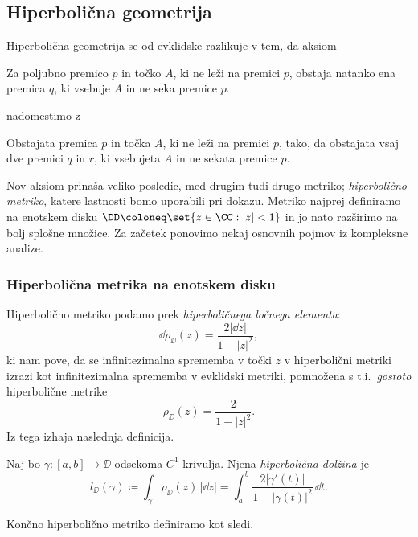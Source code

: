 \subsection{Hiperbolična geometrija}

Hiperbolična geometrija se od evklidske razlikuje v tem, da aksiom

\begin{aksiom}
    Za poljubno premico \(p\) in točko \(A\), ki ne leži na premici \(p\), obstaja natanko ena premica \(q\), ki vsebuje \(A\) in ne seka premice \(p\).
\end{aksiom}

\noindent nadomestimo z

\begin{aksiom}
    Obstajata premica \(p\) in točka \(A\), ki ne leži na premici \(p\), tako, da obstajata vsaj dve premici \(q\) in \(r\), ki vsebujeta \(A\) in ne sekata premice \(p\).
\end{aksiom}

\noindent Nov aksiom prinaša veliko posledic, med drugim tudi drugo metriko; \emph{hiperbolično metriko}, katere lastnosti bomo uporabili pri dokazu. Metriko najprej definiramo na enotskem disku \(\DD \coloneq \set{z \in \CC : |z| < 1}\) in jo nato razširimo na bolj splošne množice. Za začetek ponovimo nekaj osnovnih pojmov iz kompleksne analize.

\subsubsection{Hiperbolična metrika na enotskem disku}

Hiperbolično metriko podamo prek \emph{hiperboličnega ločnega elementa}:
\[\dd \rho_{\DD} (z) = \frac{2 |\dd z|}{1 - |z|^2},\]
ki nam pove, da se infinitezimalna sprememba v točki \(z\) v hiperbolični metriki izrazi kot infinitezimalna sprememba v evklidski metriki, pomnožena s t.i.~\emph{gostoto} hiperbolične metrike
\[\rho_{\DD} (z) = \frac{2}{1 - |z|^2}.\]
Iz tega izhaja naslednja definicija.

\begin{definicija}
    Naj bo \(\gamma \colon [a, b] \to \DD\) odsekoma \(C^1\) krivulja. Njena \emph{hiperbolična dolžina} je
    \[l_{\DD} (\gamma) \coloneq \int_{\gamma} \rho_{\DD} (z) \, | \dd z | = \int_{a}^{b} \frac{2 | \gamma' (t) | }{1 - | \gamma (t) |^2} \, \dd t.\]
\end{definicija}

\noindent Končno hiperbolično metriko definiramo kot sledi.

